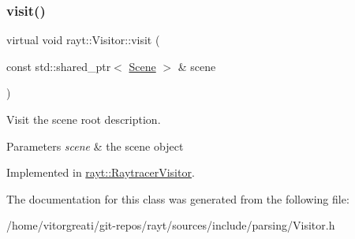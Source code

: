 \subsubsection{\texorpdfstring{visit()}{visit()}}
{\footnotesize\ttfamily virtual void rayt\+::\+Visitor\+::visit (\begin{DoxyParamCaption}\item[{const std\+::shared\+\_\+ptr$<$ \mbox{\hyperlink{classrayt_1_1_scene}{Scene}} $>$ \&}]{scene }\end{DoxyParamCaption})\hspace{0.3cm}{\ttfamily [pure virtual]}}



Visit the scene root description. 


\begin{DoxyParams}{Parameters}
{\em scene} & the scene object \\
\hline
\end{DoxyParams}


Implemented in \mbox{\hyperlink{classrayt_1_1_raytracer_visitor_ac469c21e8ac5e9a01ca6a58108bc860e}{rayt\+::\+Raytracer\+Visitor}}.



The documentation for this class was generated from the following file\+:\begin{DoxyCompactItemize}
\item 
/home/vitorgreati/git-\/repos/rayt/sources/include/parsing/Visitor.\+h\end{DoxyCompactItemize}
